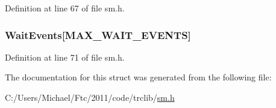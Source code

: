 Definition at line 67 of file sm.h.

\hypertarget{struct_s_m_a952b78bab0b85b9c93ecd00e76214247}{
\subsubsection[{WaitEvents}]{ {\bf WaitEvents}\mbox{[}MAX\_\-WAIT\_\-EVENTS\mbox{]}}}
\label{struct_s_m_a952b78bab0b85b9c93ecd00e76214247}


Definition at line 71 of file sm.h.



The documentation for this struct was generated from the following file:\begin{DoxyCompactItemize}
\item 
C:/Users/Michael/Ftc/2011/code/trclib/\hyperlink{sm_8h}{sm.h}\end{DoxyCompactItemize}
